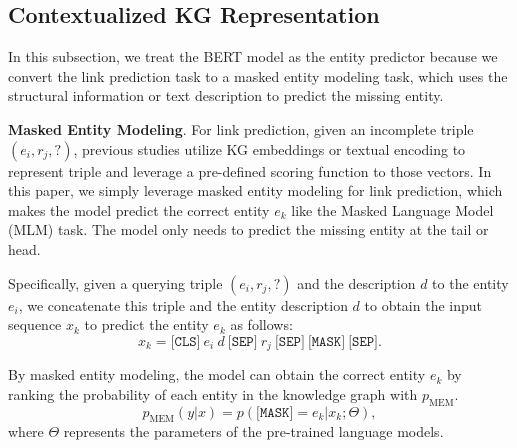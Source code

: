 \documentclass[runningheads]{llncs}
\begin{document}
\subsection{Contextualized KG Representation}
\label{sec:contextualized kg representation}


\label{sec:masked entity prediction}


In this subsection, we treat the BERT model as the entity predictor because we convert the link prediction task to a masked entity modeling task, which uses the structural information or text description to predict the missing entity.

\textbf{Masked Entity Modeling}.
For link prediction, given an incomplete triple $(e_i,r_j,?)$, previous studies utilize KG embeddings or textual encoding to represent triple and leverage a pre-defined scoring function to those vectors. 
In this paper, we simply leverage masked entity modeling for link prediction, which makes the model predict the correct entity $e_k$ like the Masked Language Model (MLM) task.
The model only needs to predict the missing entity at the tail or head\cite{zhang2023multimodal}.

Specifically, given a querying triple $(e_i, r_j, ?)$ and the description $d$ to the entity $e_i$, we concatenate this triple and the entity description $d$ to obtain the input sequence $x_k$ to predict the entity $e_k$ as follows:
$$
x_k = \texttt{[CLS]} \ e_i \ d \ \texttt{[SEP]} \ r_j  \ \texttt{[SEP]} \ \texttt{[MASK]} \ \texttt{[SEP]}.
$$

By masked entity modeling, the model can obtain the correct entity $e_k$ by ranking the probability of each entity in the knowledge graph with $p_{\text{MEM}}$.
\begin{equation}
    p_{\text{MEM}}(y|x) = p(\texttt{[MASK]} = e_k | x_k ; \Theta),
\label{eq:p_mem}
\end{equation}
where $\Theta$ represents the parameters of the pre-trained language models.

\let\mc\multicolumn
\end{document}

